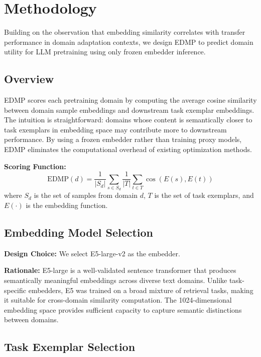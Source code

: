 \section{Methodology}
\label{sec:methodology}

Building on the observation that embedding similarity correlates with transfer performance in domain adaptation contexts, we design EDMP to predict domain utility for LLM pretraining using only frozen embedder inference.

\subsection{Overview}

EDMP scores each pretraining domain by computing the average cosine similarity between domain sample embeddings and downstream task exemplar embeddings. The intuition is straightforward: domains whose content is semantically closer to task exemplars in embedding space may contribute more to downstream performance. By using a frozen embedder rather than training proxy models, EDMP eliminates the computational overhead of existing optimization methods.

\textbf{Scoring Function:}
\begin{equation}
\text{EDMP}(d) = \frac{1}{|S_d|} \sum_{s \in S_d} \frac{1}{|T|} \sum_{t \in T} \cos(E(s), E(t))
\end{equation}
where $S_d$ is the set of samples from domain $d$, $T$ is the set of task exemplars, and $E(\cdot)$ is the embedding function.

\subsection{Embedding Model Selection}

\textbf{Design Choice:} We select E5-large-v2 \citep{wang2022text} as the embedder.

\textbf{Rationale:} E5-large is a well-validated sentence transformer that produces semantically meaningful embeddings across diverse text domains. Unlike task-specific embedders, E5 was trained on a broad mixture of retrieval tasks, making it suitable for cross-domain similarity computation. The 1024-dimensional embedding space provides sufficient capacity to capture semantic distinctions between domains.

\subsection{Task Exemplar Selection}

